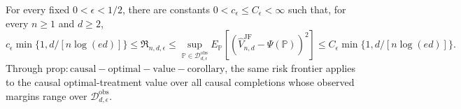 For every fixed \(0<\epsilon<1/2\), there are constants \(0<c_\epsilon\leq C_\epsilon<\infty\) such that, for every \(n\geq1\) and \(d\geq2\),
\[
c_\epsilon\min\{1,d/[n\log(ed)]\}\leq\mathfrak R_{n,d,\epsilon}
\leq\sup_{\mathbb P\in\mathcal D_{d,\epsilon}^{\mathrm{obs}}}E_{\mathbb P}[(\widehat V_{n,d}^{\mathrm{JF}}-\Psi(\mathbb P))^2]
\leq C_\epsilon\min\{1,d/[n\log(ed)]\}.
\]
Through \(\mathrm{prop:causal-optimal-value-corollary}\), the same risk frontier applies to the causal optimal-treatment value over all causal completions whose observed margins range over \(\mathcal D_{d,\epsilon}^{\mathrm{obs}}\).